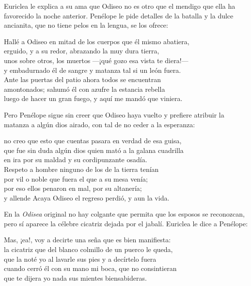 Euriclea le explica a su ama que Odiseo no es otro que el mendigo que ella ha favorecido la noche anterior. Penélope le pide detalles de la batalla y la dulce ancianita, que no tiene pelos en la lengua, se los ofrece:

\begin{versocita}
Hallé a Odiseo en mitad de los cuerpos que él mismo abatiera,\\
erguido, y a su redor, abrazando la muy dura tierra,\\
unos sobre otros, los muertos ---¡qué gozo esa vista te diera!---\\
y embadurnado él de sangre y matanza tal si un león fuera.\\
Ante las puertas del patio ahora todos se encuentran\\
amontonados; sahumó él con azufre la estancia rebella\\
luego de hacer un gran fuego, y aquí me mandó que viniera.
\end{versocita}

Pero Penélope sigue sin creer que Odiseo haya vuelto y prefiere atribuir la matanza a algún dios airado, con tal de no ceder a la esperanza:

\begin{versocita}
no creo que esto que cuentas pasara en verdad de esa guisa,\\
que fue sin duda algún dios quien mató a la galana cuadrilla\\
en ira por su maldad y su cordipunzante osadía.\\
Respeto a hombre ninguno de los de la tierra tenían\\
por vil o noble que fuera el que a su mesa venía;\\
por eso ellos penaron en mal, por su altanería;\\
y allende Acaya Odiseo el regreso perdió, y aun la vida.
\end{versocita}

En la \emph{Odisea} original no hay colgante que permita que los esposos se reconozcan, pero sí aparece la célebre cicatriz dejada por el jabalí. Euriclea le dice a Penélope:

\begin{versocita}
Mas, ¡ea!, voy a decirte una seña que es bien manifiesta:\\
la cicatriz que del blanco colmillo de un puerco le queda,\\
que la noté yo al lavarle sus pies y a decírtelo fuera\\
cuando cerró él con su mano mi boca, que no consintieran\\
que te dijera yo nada sus mientes biensabideras.
\end{versocita}

